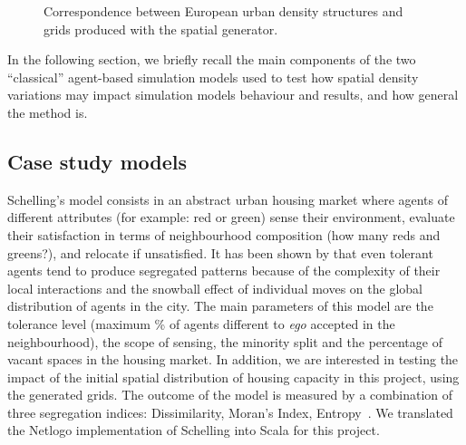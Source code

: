 \documentclass[3p,times,procedia]{elsarticle}
\begin{document}
\begin{figure}[htbp] \begin{center} 
 \caption{Correspondence between European urban density structures and grids produced with the spatial generator.} 
\label{fig:densityTypes} \end{center} \end{figure} %

In the following section, we briefly recall the main components of the two ``classical'' agent-based simulation models used to test how spatial density variations may impact simulation models behaviour and results, and how general the method is.

\subsection{Case study models}

Schelling's model consists in an abstract urban housing market where agents of different attributes (for example: red or green) sense their environment, evaluate their satisfaction in terms of neighbourhood composition (how many reds and greens?), and relocate if unsatisfied. It has been shown by \cite{Schelling1969} that even tolerant agents tend to produce segregated patterns because of the complexity of their local interactions and the snowball effect of individual moves on the global distribution of agents in the city. The main parameters of this model are the tolerance level (maximum \% of agents different to {\it ego} accepted in the neighbourhood), the scope of sensing, the minority split and the percentage of vacant spaces in the housing market. In addition, we are interested in testing the impact of the initial spatial distribution of housing capacity in this project, using the generated grids. The outcome of the model is measured by a combination of three segregation indices: Dissimilarity, Moran's Index, Entropy~\citep{brown2006spatial}. We translated the Netlogo implementation of Schelling into Scala for this project.
\end{document}
